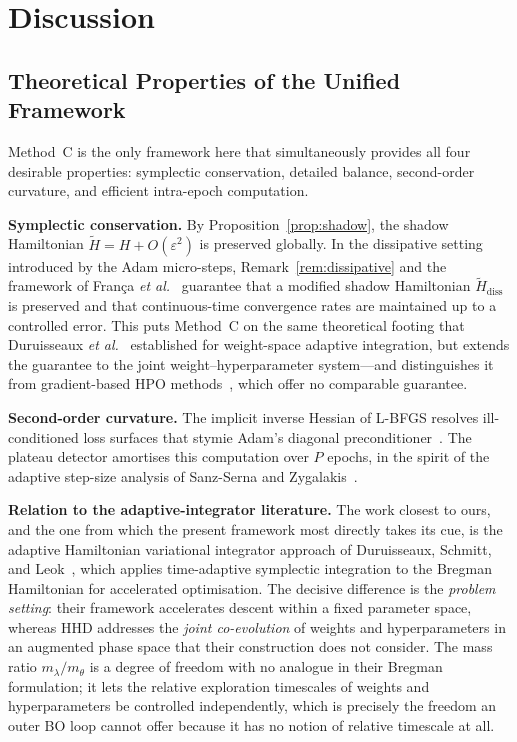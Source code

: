 \documentclass[11pt]{article}
\theoremstyle{definition}
\newcommand{\tHH}{\widetilde{H}}
\begin{document}
\section{Discussion}

\subsection{Theoretical Properties of the Unified Framework}

Method~C is the only framework here that simultaneously provides all
four desirable properties: symplectic conservation, detailed
balance, second-order curvature, and efficient intra-epoch
computation.

\textbf{Symplectic conservation.} By
Proposition~\ref{prop:shadow}, the shadow Hamiltonian
$\tHH=H+O(\varepsilon^2)$ is preserved globally. In the dissipative
setting introduced by the Adam micro-steps,
Remark~\ref{rem:dissipative} and the framework of Fran\c{c}a \emph{et
al.}~\cite{franca2021dissipative} guarantee that a modified shadow
Hamiltonian $\tHH_{\mathrm{diss}}$ is preserved and that
continuous-time convergence rates are maintained up to a controlled
error. This puts Method~C on the same theoretical footing that
Duruisseaux \emph{et al.}~\cite{duruisseaux2021adaptive} established
for weight-space adaptive integration, but extends the guarantee to
the joint weight--hyperparameter system---and distinguishes it from
gradient-based HPO
methods~\cite{lorraine2020millions,franceschi2018bilevel}, which
offer no comparable guarantee.

\textbf{Second-order curvature.} The implicit inverse Hessian of
L-BFGS resolves ill-conditioned loss surfaces that stymie Adam's
diagonal preconditioner~\cite{liu1989lbfgs}. The plateau detector
amortises this computation over $P$ epochs, in the spirit of the
adaptive step-size analysis of Sanz-Serna and
Zygalakis~\cite{sanzserna2021lyapunov}.

\textbf{Relation to the adaptive-integrator literature.} The work
closest to ours, and the one from which the present framework most
directly takes its cue, is the adaptive Hamiltonian variational
integrator approach of Duruisseaux, Schmitt, and
Leok~\cite{duruisseaux2021adaptive,duruisseaux2022variational},
which applies time-adaptive symplectic integration to the Bregman
Hamiltonian for accelerated optimisation. The decisive difference is
the \emph{problem setting}: their framework accelerates descent
within a fixed parameter space, whereas HHD addresses the
\emph{joint co-evolution} of weights and hyperparameters in an
augmented phase space that their construction does not consider. The
mass ratio $m_\lambda/m_\theta$ is a degree of freedom with no analogue
in their Bregman formulation; it lets the relative exploration
timescales of weights and hyperparameters be controlled
independently, which is precisely the freedom an outer BO loop cannot
offer because it has no notion of relative timescale at all.
\end{document}
